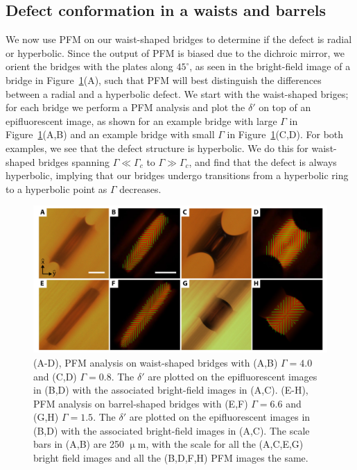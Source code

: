 \subsection{Defect conformation in a waists and barrels}
We now use PFM on our waist-shaped bridges to determine if the defect is radial or hyperbolic.
Since the output of PFM is biased due to the dichroic mirror, we orient the bridges with the plates along $45^{\circ}$, as seen in the bright-field image of a bridge in Figure~\ref{f:5-PFM_Bridge}(A), such that PFM will best distinguish the differences between a radial and a hyperbolic defect.
We start with the waist-shaped briges; for each bridge we perform a PFM analysis and plot the $\delta'$ on top of an epifluorescent image, as shown for an example bridge with large $\Gamma$ in Figure~\ref{f:5-PFM_Bridge}(A,B) and an example bridge with small $\Gamma$ in Figure~\ref{f:5-PFM_Bridge}(C,D).
For both examples, we see that the defect structure is hyperbolic.
We do this for waist-shaped bridges spanning $\Gamma \ll \Gamma_c$ to $\Gamma \gg \Gamma_c$, and find that the defect is always hyperbolic, implying that our bridges undergo transitions from a hyperbolic ring to a hyperbolic point as $\Gamma$ decreases.
\begin{figure}
  \centering
  \includegraphics{figures/C5/Ch5-Figs_PFM_Bridge.png}
  \caption{(A-D), PFM analysis on waist-shaped bridges with (A,B) $\Gamma = 4.0$ and (C,D) $\Gamma = 0.8$.
  The $\delta'$ are plotted on the epifluorescent images in (B,D) with the associated bright-field images in (A,C).
  (E-H), PFM analysis on barrel-shaped bridges with (E,F) $\Gamma = 6.6$ and (G,H) $\Gamma = 1.5$.
 The $\delta'$ are plotted on the epifluorescent images in (B,D) with the associated bright-field images in (A,C).
 The scale bars in (A,B) are 250 $\upmu$m, with the scale for all the (A,C,E,G) bright field images and all the (B,D,F,H) PFM images the same.}\label{f:5-PFM_Bridge}
\end{figure}

